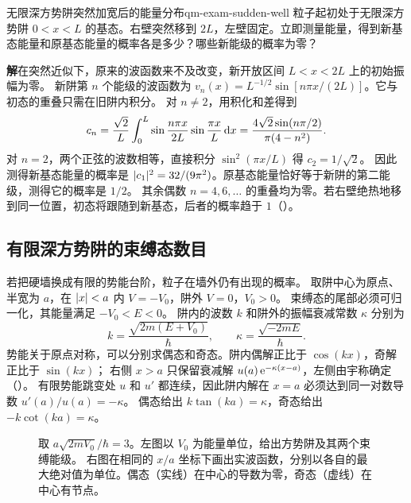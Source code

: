 \begin{example}{无限深方势阱突然加宽后的能量分布}{qm-exam-sudden-well}
    粒子起初处于无限深方势阱 $0 < x < L$ 的基态。右壁突然移到 $2L$，左壁固定。立即测量能量，得到新基态能量和原基态能量的概率各是多少？哪些新能级的概率为零？

    \par\smallskip\textbf{解}\quad 在突然近似下，原来的波函数来不及改变，新开放区间 $L < x < 2L$ 上的初始振幅为零。
    新阱第 $n$ 个能级的波函数为 $v_n(x) = L^{-1/2}\sin[n\pi x/(2L)]$。它与初态的重叠只需在旧阱内积分。
    对 $n \ne 2$，用积化和差得到
    \[
        c_n = \frac{\sqrt 2}{L}\int_0^L
            \sin\frac{n\pi x}{2L}\sin\frac{\pi x}{L}\mathop{}\!\mathrm{d} x
            = \frac{4\sqrt 2\sin(n\pi/2)}{\pi(4 - n^2)} .
    \]
    对 $n = 2$，两个正弦的波数相等，直接积分 $\sin^2(\pi x/L)$ 得 $c_2 = 1/\sqrt 2$。
    因此测得新基态能量的概率是 $\lvert c_1\rvert^2 = 32/(9\pi^2)$。原基态能量恰好等于新阱的第二能级，测得它的概率是 $1/2$。
    其余偶数 $n = 4,6,\ldots$ 的重叠均为零。若右壁绝热地移到同一位置，初态将跟随到新基态，后者的概率趋于 $1$（）。
\end{example}

\subsection{有限深方势阱的束缚态数目}
\label{ss:finite-well}
若把硬墙换成有限的势能台阶，粒子在墙外仍有出现的概率。
取阱中心为原点、半宽为 $a$，在 $\lvert x\rvert < a$ 内 $V = -V_0$，阱外 $V = 0$，$V_0 > 0$。
束缚态的尾部必须可归一化，其能量满足 $-V_0 < E < 0$。
阱内的波数 $k$ 和阱外的振幅衰减常数 $\kappa$ 分别为
\begin{equation}\label{eq:qm-finite-well-wave-numbers}
    k = \frac{\sqrt{2m(E + V_0)}}{\hbar},\qquad
    \kappa = \frac{\sqrt{-2mE}}{\hbar}.
\end{equation}
势能关于原点对称，可以分别求偶态和奇态。阱内偶解正比于 $\cos(kx)$，奇解正比于 $\sin(kx)$；
右侧 $x > a$ 只保留衰减解 $u(a)\mathop{}\!\mathrm{e}^{-\kappa(x-a)}$，左侧由宇称确定（）。
有限势能跳变处 $u$ 和 $u'$ 都连续，因此阱内解在 $x = a$ 必须达到同一对数导数 $u'(a)/u(a) = -\kappa$。
偶态给出 $k\tan(ka) = \kappa$，奇态给出 $-k\cot(ka) = \kappa$。
\begin{figure}[htbp]
    \centering
    \caption{取 $a\sqrt{2mV_0}/\hbar = 3$。左图以 $V_0$ 为能量单位，给出方势阱及其两个束缚能级。
        右图在相同的 $x/a$ 坐标下画出实波函数，分别以各自的最大绝对值为单位。偶态（实线）在中心的导数为零，奇态（虚线）在中心有节点。}
    \label{fig:finite-well-parity}
\end{figure}

